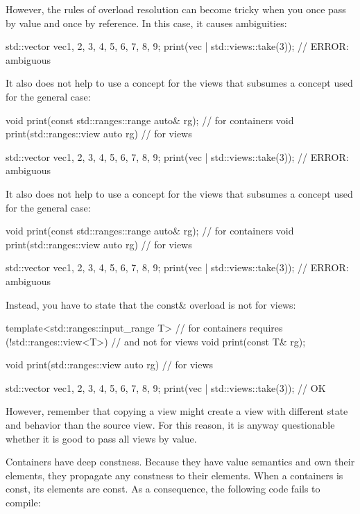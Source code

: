 However, the rules of overload resolution can become tricky when you once pass by value and once by reference. In this case, it causes ambiguities:

\begin{cpp}
std::vector vec{1, 2, 3, 4, 5, 6, 7, 8, 9};
print(vec | std::views::take(3)); // ERROR: ambiguous
\end{cpp}

It also does not help to use a concept for the views that subsumes a concept used for the general case:

\begin{cpp}
void print(const std::ranges::range auto& rg); // for containers
void print(std::ranges::view auto rg) // for views

std::vector vec{1, 2, 3, 4, 5, 6, 7, 8, 9};
print(vec | std::views::take(3)); // ERROR: ambiguous
\end{cpp}

It also does not help to use a concept for the views that subsumes a concept used for the general case:

\begin{cpp}
void print(const std::ranges::range auto& rg); // for containers
void print(std::ranges::view auto rg) // for views

std::vector vec{1, 2, 3, 4, 5, 6, 7, 8, 9};
print(vec | std::views::take(3)); // ERROR: ambiguous
\end{cpp}

Instead, you have to state that the const\& overload is not for views:

\begin{cpp}
template<std::ranges::input_range T> // for containers
requires (!std::ranges::view<T>) // and not for views
void print(const T& rg);

void print(std::ranges::view auto rg) // for views

std::vector vec{1, 2, 3, 4, 5, 6, 7, 8, 9};
print(vec | std::views::take(3)); // OK
\end{cpp}

However, remember that copying a view might create a view with different state and behavior than the source view. For this reason, it is anyway questionable whether it is good to pass all views by value.


Containers have deep constness. Because they have value semantics and own their elements, they propagate any constness to their elements. When a containers is const, its elements are const. As a consequence, the following code fails to compile:

